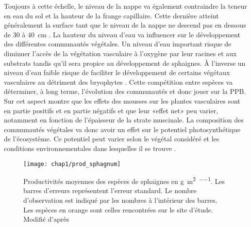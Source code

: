 Toujours à cette échelle, le niveau de la nappe va également contraindre la teneur en eau du sol et la hauteur de la frange capillaire.
Cette dernière atteint généralement la surface tant que le niveau de la nappe ne descend pas en dessous de \num{30} à \SI{40}{\centi\metre} \citep{laiho2006}.
La hauteur du niveau d'eau va influencer sur le développement des différentes communautés végétales.
Un niveau d'eau important risque de diminuer l'accès de la végétation vasculaire à l'oxygène par leur racines et aux substrats tandis qu'il sera propice au développement de sphaignes.
À l'inverse un niveau d'eau faible risque de faciliter le développement de certains végétaux vasculaires au détriment des bryophytes \plop.
Cette compétition entre espèces va déterminer, à long terme, l'évolution des communautés et donc jouer sur la PPB.
Sur cet aspect \citet{gornall2011} montre que les effets des mousses sur les plantes vasculaires sont en partie positifs et en partie négatifs et que leur «effet net» peu varier, notamment en fonction de l'épaisseur de la strate muscinale.
La composition des communautés végétales va donc avoir un effet sur le potentiel photosynthétique de l'écosystème.
Ce potentiel peut varier selon le végétal considéré et les conditions environnementales dans lesquelles il se trouve \citep{moore2002}.

\begin{figure}
\centering
\texttt{[image: chap1/prod\_sphagnum]}
\caption{Productivités moyennes des espèces de sphaignes en \si{\gram\per\square\metre\per\year}. Les barres d'erreurs représentent l'erreur standard. Le nombre d'observation est indiqué par les nombres à l'intérieur des barres. Les espèces en orange sont celles rencontrées sur le site d'étude. Modifié d'après \citet{gunnarsson2005}}
\label{fig:prod_sphagnum}
\end{figure}

